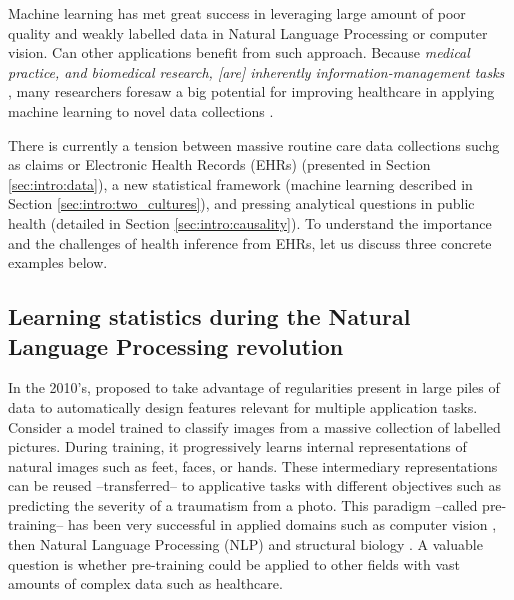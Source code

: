 \documentclass[french,12pt,twoside,a4paper]{book}
\begin{document}
Machine learning has met great success in leveraging large amount of poor
quality and weakly labelled data in Natural Language Processing or computer
vision. Can other applications benefit from such approach. Because
\textit{medical practice, and biomedical research, [are] inherently
  information-management tasks} \citep{patel2009coming}, many researchers foresaw
a big potential for improving healthcare in applying machine learning to novel
data collections \citep{topol2019high,rajkomar2019machine}.

There is currently a tension between massive routine care data collections suchg
as claims or Electronic Health Records (EHRs) (presented in Section
\ref{sec:intro:data}), a new statistical framework (machine learning
\citep{breiman2001statistical} described in Section
\ref{sec:intro:two_cultures}), and pressing analytical questions in public
health (detailed in Section \ref{sec:intro:causality}). To understand the
importance and the challenges of health inference from EHRs, let us discuss
three concrete examples below.

\subsection{Learning statistics during the Natural Language Processing revolution}

In the 2010's, \cite{halevy2009unreasonable} proposed to take advantage of
regularities present in large piles of data to automatically design features
relevant for multiple application tasks. Consider a model trained to classify
images from a massive collection of labelled pictures. During training, it
progressively learns internal representations of natural images such as feet,
faces, or hands. These intermediary representations can be reused
--transferred-- to applicative tasks with different objectives such as
predicting the severity of a traumatism from a photo. This paradigm --called
pre-training-- has been very successful in applied domains such as computer
vision \citep{krizhevsky2012imagenet}, then Natural Language Processing (NLP)
\citep{devlin2018bert} and structural biology \citep{jumper2021highly}. A
valuable question is whether pre-training could be applied to other fields with
vast amounts of complex data such as healthcare.

\end{document}
